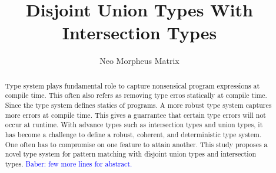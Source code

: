 \documentclass[UKenglish]{acmart}
\title{Disjoint Union Types With Intersection Types}
\author{Neo Morpheus Matrix}
\newcommand\mynote[3]{\textcolor{#2}{#1: #3}}
\newcommand\baber[1]{\mynote{Baber}{blue}{#1}}
\begin{document}
\begin{abstract}
Type system plays fundamental role to capture nonsensical program expressions at compile time. This often also refers as removing type erros statically at compile time. Since the type system defines statics of programs. A more robust type system captures more errors at compile time. This gives a guarrantee that certain type errors will not occur at runtime. With advance types such as intersection types and union types, it has become a challenge to define a robust, coherent, and deterministic type system. One often has to compromise on one feature to attain another. This study proposes a novel type system for pattern matching with disjoint union types and intersection types. \baber{few more lines for abstract.}
\end{abstract}

\maketitle













\end{document}
